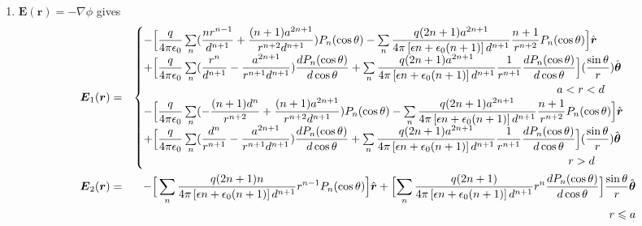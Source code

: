 \documentclass[a4paper,9pt]{article}
\begin{document}
\begin{enumerate}
\begin{enumerate}
    \item $\boldsymbol{E}(\boldsymbol{r})=-\nabla\phi$ gives
    \begin{eqnarray}
      \boldsymbol{E}_1(\boldsymbol{r})&=&
      \begin{cases}
        -\Big[\dfrac{q}{4\pi\epsilon_0}\sum\limits_{n}(\dfrac{n r^{n-1}}{d^{n+1}}+\dfrac{(n+1)a^{2n+1}}{r^{n+2}d^{n+1}})P_n(\cos\theta)-\sum\limits_{n}\dfrac{q(2n+1)a^{2n+1}}{4\pi\left[\epsilon n+\epsilon_0(n+1)\right]d^{n+1}}\dfrac{n+1}{r^{n+2}}P_n(\cos\theta)\Big]\hat{\boldsymbol{r}}\nonumber\\
        +\Bigl[\dfrac{q}{4\pi\epsilon_0}\sum\limits_{n}(\dfrac{r^n}{d^{n+1}}-\dfrac{a^{2n+1}}{r^{n+1} d^{n+1}})\dfrac{dP_n(\cos\theta)}{d\cos\theta}+\sum\limits_{n}\dfrac{q(2n+1)a^{2n+1}}{4\pi\left[\epsilon n+\epsilon_0(n+1)\right]d^{n+1}}\dfrac{1}{r^{n+1}}\dfrac{dP_n(\cos\theta)}{d\cos\theta}\Bigr](\dfrac{\sin\theta}{r})\hat{\boldsymbol{\theta}}\\
        ~\quad\quad\quad\quad\quad\quad\quad\quad\quad\quad\quad\quad\quad\quad\quad\quad\quad\quad\quad\quad\quad\quad\quad\quad\quad\quad\quad\quad\quad\quad\quad\quad\quad\quad\quad\quad a<r<d\\
        -\Big[\dfrac{q}{4\pi\epsilon_0}\sum\limits_{n}(-\dfrac{(n+1) d^{n}}{r^{n+2}}+\dfrac{(n+1)a^{2n+1}}{r^{n+2}d^{n+1}})P_n(\cos\theta)-\sum\limits_{n}\dfrac{q(2n+1)a^{2n+1}}{4\pi\left[\epsilon n+\epsilon_0(n+1)\right]d^{n+1}}\dfrac{n+1}{r^{n+2}}P_n(\cos\theta)\Big]\hat{\boldsymbol{r}}\nonumber\\
        +\Bigl[\dfrac{q}{4\pi\epsilon_0}\sum\limits_{n}(\dfrac{d^n}{r^{n+1}}-\dfrac{a^{2n+1}}{r^{n+1} d^{n+1}})\dfrac{dP_n(\cos\theta)}{d\cos\theta}+\sum\limits_{n}\dfrac{q(2n+1)a^{2n+1}}{4\pi\left[\epsilon n+\epsilon_0(n+1)\right]d^{n+1}}\dfrac{1}{r^{n+1}}\dfrac{dP_n(\cos\theta)}{d\cos\theta}\Bigr](\dfrac{\sin\theta}{r})\hat{\boldsymbol{\theta}}\\
        ~\quad\quad\quad\quad\quad\quad\quad\quad\quad\quad\quad\quad\quad\quad\quad\quad\quad\quad\quad\quad\quad\quad\quad\quad\quad\quad\quad\quad\quad\quad\quad\quad\quad\quad\quad\quad\quad r>d
      \end{cases}\nonumber\\
      \boldsymbol{E}_2(\boldsymbol{r})&=&
      -\Big[\sum\limits_{n}\dfrac{q(2n+1)n}{4\pi\left[\epsilon n+\epsilon_0(n+1)\right]d^{n+1}}r^{n-1} P_n(\cos\theta)\Big]\hat{\boldsymbol{r}}+\Bigl[\sum\limits_{n}\dfrac{q(2n+1)}{4\pi\left[\epsilon n+\epsilon_0(n+1)\right]d^{n+1}}r^n \dfrac{dP_n(\cos\theta)}{d\cos\theta}\Bigr]\dfrac{\sin\theta}{r}\hat{\boldsymbol{\theta}}\nonumber\\
      &&~\quad\quad\quad\quad\quad\quad\quad\quad\quad\quad\quad\quad\quad\quad\quad\quad\quad\quad\quad\quad\quad\quad\quad\quad\quad\quad\quad\quad\quad\quad\quad\quad\quad\quad\quad\quad\quad\quad r\leqslant a\nonumber\\
    \end{eqnarray}
    

\end{enumerate}
\end{enumerate}
\end{document}
